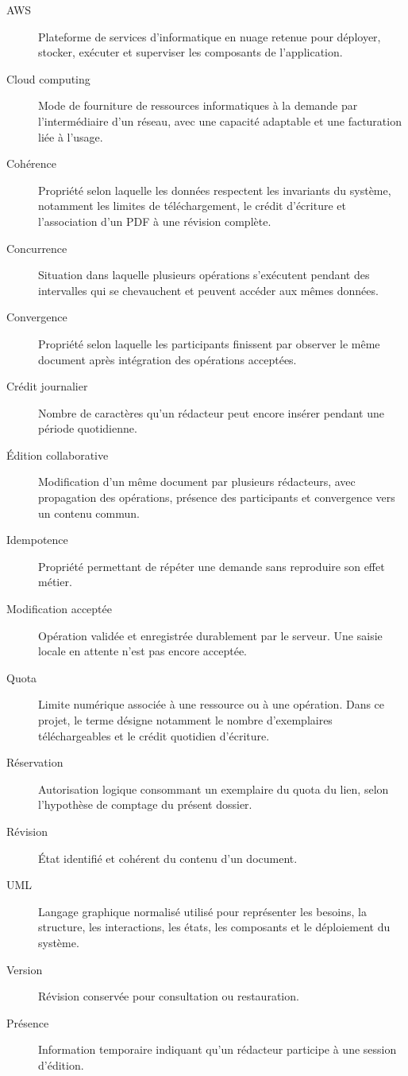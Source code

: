 \begin{description}
\item[AWS] Plateforme de services d'informatique en nuage retenue pour déployer, stocker, exécuter et superviser les composants de l'application.
\item[Cloud computing] Mode de fourniture de ressources informatiques à la demande par l'intermédiaire d'un réseau, avec une capacité adaptable et une facturation liée à l'usage.
\item[Cohérence] Propriété selon laquelle les données respectent les invariants du système, notamment les limites de téléchargement, le crédit d'écriture et l'association d'un PDF à une révision complète.
\item[Concurrence] Situation dans laquelle plusieurs opérations s'exécutent pendant des intervalles qui se chevauchent et peuvent accéder aux mêmes données.
\item[Convergence] Propriété selon laquelle les participants finissent par observer le même document après intégration des opérations acceptées.
\item[Crédit journalier] Nombre de caractères qu'un rédacteur peut encore insérer pendant une période quotidienne.
\item[Édition collaborative] Modification d'un même document par plusieurs rédacteurs, avec propagation des opérations, présence des participants et convergence vers un contenu commun.
\item[Idempotence] Propriété permettant de répéter une demande sans reproduire son effet métier.
\item[Modification acceptée] Opération validée et enregistrée durablement par le serveur. Une saisie locale en attente n'est pas encore acceptée.
\item[Quota] Limite numérique associée à une ressource ou à une opération. Dans ce projet, le terme désigne notamment le nombre d'exemplaires téléchargeables et le crédit quotidien d'écriture.
\item[Réservation] Autorisation logique consommant un exemplaire du quota du lien, selon l'hypothèse de comptage du présent dossier.
\item[Révision] État identifié et cohérent du contenu d'un document.
\item[UML] Langage graphique normalisé utilisé pour représenter les besoins, la structure, les interactions, les états, les composants et le déploiement du système.
\item[Version] Révision conservée pour consultation ou restauration.
\item[Présence] Information temporaire indiquant qu'un rédacteur participe à une session d'édition.
\end{description}
